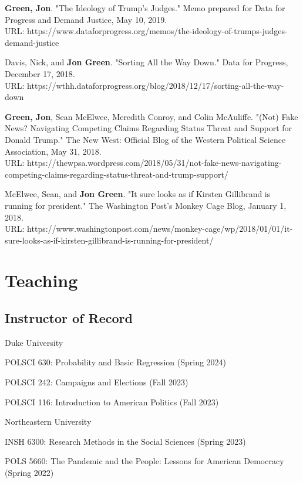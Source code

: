 \documentclass[letterpaper]{article}
\renewenvironment{itemize}{
  \begin{list}{}{
    \setlength{\leftmargin}{1.5em}
  }
}{
  \end{list}
}
\begin{document}
\begin{itemize}
\item \textbf{Green, Jon}. "The Ideology of Trump's Judges." Memo prepared for Data for Progress and Demand Justice, May 10, 2019. \\
URL: https://www.dataforprogress.org/memos/the-ideology-of-trumps-judges-demand-justice

\item Davis, Nick, and \textbf{Jon Green}. "Sorting All the Way Down." Data for Progress, December 17, 2018. \\
URL: https://wthh.dataforprogress.org/blog/2018/12/17/sorting-all-the-way-down

\item \textbf{Green, Jon}, Sean McElwee, Meredith Conroy, and Colin McAuliffe. "(Not) Fake News? Navigating Competing Claims Regarding Status Threat and Support for Donald Trump." The New West: Official Blog of the Western Political Science Association, May 31, 2018. \\
URL: https://thewpsa.wordpress.com/2018/05/31/not-fake-news-navigating-competing-claims-regarding-status-threat-and-trump-support/

\item McElwee, Sean, and \textbf{Jon Green}. "It sure looks as if Kirsten Gillibrand is running for president." The Washington Post's Monkey Cage Blog, January 1, 2018. \\ 
URL: https://www.washingtonpost.com/news/monkey-cage/wp/2018/01/01/it-sure-looks-as-if-kirsten-gillibrand-is-running-for-president/
\end{itemize}

\section*{Teaching}

\subsection*{Instructor of Record}

\begin{itemize}

\item Duke University
	\begin{itemize}
	\item POLSCI 630: Probability and Basic Regression (Spring 2024)
	\item POLSCI 242: Campaigns and Elections (Fall 2023)
	\item POLSCI 116: Introduction to American Politics (Fall 2023)
	\end{itemize}

\item Northeastern University 
	\begin{itemize}
	\item INSH 6300: Research Methods in the Social Sciences (Spring 2023)
	\item POLS 5660: The Pandemic and the People: Lessons for American Democracy (Spring 2022)
	\end{itemize}
\end{itemize}
\end{document}
